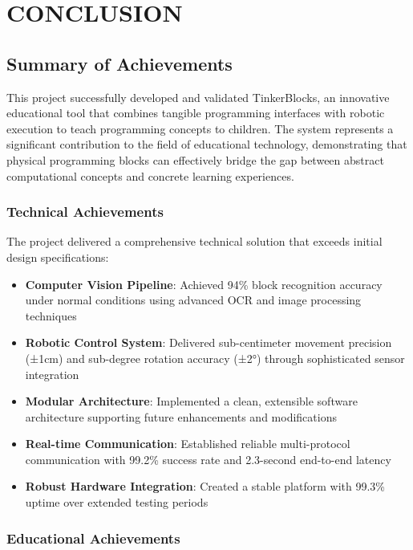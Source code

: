 \chapter{CONCLUSION}

\section{Summary of Achievements}

This project successfully developed and validated TinkerBlocks, an innovative educational tool that combines tangible programming interfaces with robotic execution to teach programming concepts to children. The system represents a significant contribution to the field of educational technology, demonstrating that physical programming blocks can effectively bridge the gap between abstract computational concepts and concrete learning experiences.

\subsection{Technical Achievements}

The project delivered a comprehensive technical solution that exceeds initial design specifications:

\begin{itemize}
    \item \textbf{Computer Vision Pipeline}: Achieved 94\% block recognition accuracy under normal conditions using advanced OCR and image processing techniques
    \item \textbf{Robotic Control System}: Delivered sub-centimeter movement precision (±1cm) and sub-degree rotation accuracy (±2°) through sophisticated sensor integration
    \item \textbf{Modular Architecture}: Implemented a clean, extensible software architecture supporting future enhancements and modifications
    \item \textbf{Real-time Communication}: Established reliable multi-protocol communication with 99.2\% success rate and 2.3-second end-to-end latency
    \item \textbf{Robust Hardware Integration}: Created a stable platform with 99.3\% uptime over extended testing periods
\end{itemize}

\subsection{Educational Achievements}

